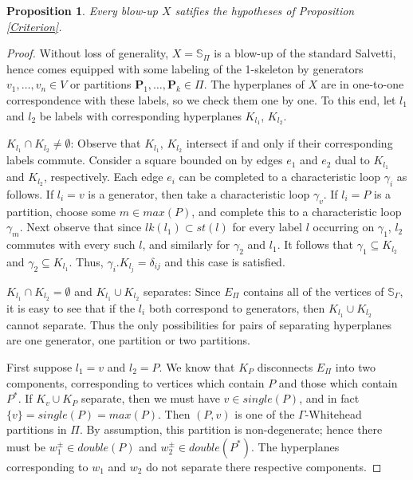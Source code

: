 \documentclass[11pt]{amsart}
\numberwithin{thm}{section}
\newtheorem{proposition}[thm]{Proposition}
\theoremstyle{remark}
\theoremstyle{definition}
\newcommand{\Sa}{\mathbb{S}}
\begin{document}
\begin{proposition} Every blow-up $X$ satifies the hypotheses of Proposition \ref{Criterion}. 
\end{proposition}
\begin{proof} Without loss of generality, $X=\Sa_\Pi$ is a blow-up of the standard Salvetti, hence comes equipped with some labeling of the 1-skeleton by generators $v_1,\ldots,v_n\in V$ or partitions $\textbf{P}_1,\ldots, \textbf{P}_k\in \Pi$.   The hyperplanes of $X$ are in one-to-one correspondence with these labels, so we check them one by one.  To this end, let $l_1$ and $l_2$ be labels with corresponding hyperplanes $K_{l_1}$, $K_{l_2}$.

$K_{l_1}\cap K_{l_2}\neq \emptyset$: Observe that $K_{l_1}$, $K_{l_2}$ intersect if and only if their corresponding labels commute. Consider a square bounded on by edges $e_1$ and $e_2$ dual to $K_{l_1}$ and $K_{l_2}$, respectively.  Each edge $e_i$ can be completed to a characteristic loop $\gamma_i$ as follows. If $l_i=v$ is a generator, then take a characteristic loop $\gamma_v$. If $l_i=P$ is a partition, choose some $m\in max(P)$, and complete this to a characteristic loop $\gamma_m$.  Next observe that since $lk(l_1)\subset st(l)$ for every label $l$ occurring on $\gamma_1$, $l_2$ commutes with every such $l$, and similarly for $\gamma_2$ and $l_1$.  It follows that $\gamma_1\subseteq K_{l_2}$ and $\gamma_2\subseteq K_{l_1}$. Thus, $\gamma_i.K_{l_j}=\delta_{ij}$ and this case is satisfied.  

$K_{l_1}\cap K_{l_2}= \emptyset$ and $K_{l_1}\cup K_{l_2}$ separates: Since $E_{\Pi}$ contains all of the vertices of $\Sa_\Gamma$, it is easy to see that if the $l_i$ both correspond to generators, then $K_{l_1}\cup K_{l_2}$ cannot separate.  Thus the only possibilities for pairs of separating hyperplanes are one generator, one partition or two partitions.  

First suppose $l_1=v$ and $l_2=P$.  We know that $K_P$ disconnects $E_\Pi$ into two components, corresponding to vertices which contain $P$ and those which contain $P^*$. If $K_v\cup K_P$ separate, then we must have $v\in single(P)$, and in fact $\{v\}=single(P)=max(P)$. Then $(P,v)$ is one of the $\Gamma$-Whitehead partitions in $\Pi$.  By assumption, this partition is non-degenerate; hence there must be $w_1^\pm\in double(P)$ and $w_2^\pm\in double(P^*)$.  The hyperplanes corresponding to $w_1$ and $w_2$ do not separate there respective components. 


\end{proof}
\end{document}

